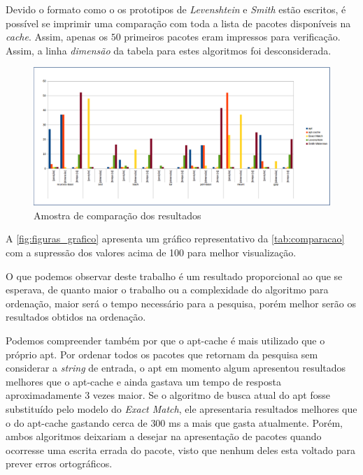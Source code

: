 Devido o formato como o os prototipos de \textit{Levenshtein} e \textit{Smith} estão escritos, é possível se imprimir uma comparação com toda a lista de pacotes disponíveis na \textit{cache}. Assim, apenas os $50$ primeiros pacotes eram impressos para verificação. Assim, a linha \textit{dimensão} da tabela para estes algoritmos foi desconsiderada.

\begin{figure}[h]
  \centering
	\includegraphics[width=\textwidth,angle=0]{figuras/grafico}
  \caption{Amostra de comparação dos resultados}
  \label{fig:figuras_grafico}
\end{figure}

A \autoref{fig:figuras_grafico} apresenta um gráfico representativo da \autoref{tab:comparacao} com a supressão dos valores acima de 100  para melhor visualização.

O que podemos observar deste trabalho é um resultado proporcional ao que se esperava, de quanto maior o trabalho ou a complexidade do algoritmo para ordenação, maior será o tempo necessário para a pesquisa, porém melhor serão os resultados obtidos na ordenação.

Podemos compreender também por que o {\code apt-cache} é mais utilizado que o próprio {\code apt}. Por ordenar todos os pacotes que retornam da pesquisa sem considerar a \textit{string} de entrada, o {\code apt} em momento algum apresentou resultados melhores que o {\code apt-cache} e ainda gastava um tempo de resposta aproximadamente 3 vezes maior. Se o algoritmo de busca atual do {\code apt} fosse substituído pelo modelo do \textit{Exact Match}, ele apresentaria resultados melhores que o do {\code apt-cache} gastando cerca de $300$ ms a mais que gasta atualmente. Porém, ambos algoritmos deixariam a desejar na apresentação de pacotes quando ocorresse uma escrita errada do pacote, visto que nenhum deles esta voltado para prever erros ortográficos.

